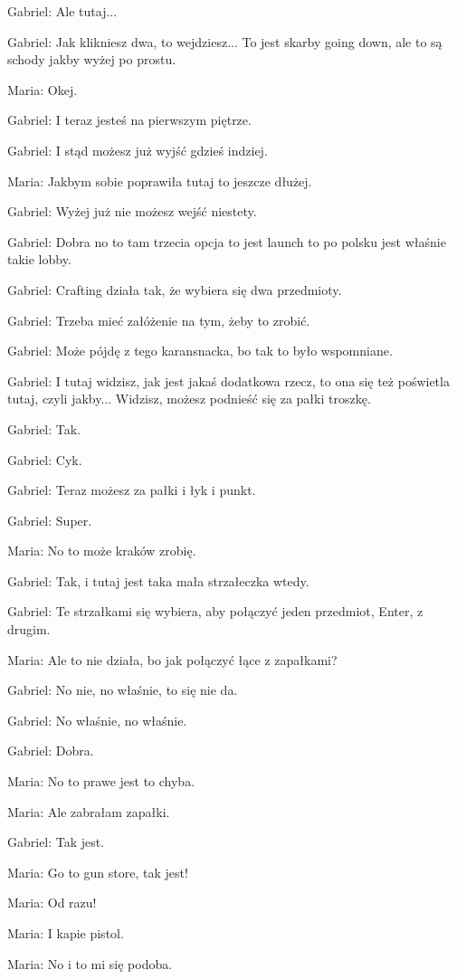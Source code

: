 Gabriel: Ale tutaj...

Gabriel: Jak klikniesz dwa, to wejdziesz... To jest skarby going down, ale to są schody jakby wyżej po prostu.

Maria: Okej.

Gabriel: I teraz jesteś na pierwszym piętrze.

Gabriel: I stąd możesz już wyjść gdzieś indziej.

Maria: Jakbym sobie poprawiła tutaj to jeszcze dłużej.

Gabriel: Wyżej już nie możesz wejść niestety.

Gabriel: Dobra no to tam trzecia opcja to jest launch to po polsku jest właśnie takie lobby.

Gabriel: Crafting działa tak, że wybiera się dwa przedmioty.

Gabriel: Trzeba mieć załóżenie na tym, żeby to zrobić.

Gabriel: Może pójdę z tego karansnacka, bo tak to było wspomniane.

Gabriel: I tutaj widzisz, jak jest jakaś dodatkowa rzecz, to ona się też poświetla tutaj, czyli jakby... Widzisz, możesz podnieść się za pałki troszkę.

Gabriel: Tak.

Gabriel: Cyk.

Gabriel: Teraz możesz za pałki i łyk i punkt.

Gabriel: Super.

Maria: No to może kraków zrobię.

Gabriel: Tak, i tutaj jest taka mała strzałeczka wtedy.

Gabriel: Te strzałkami się wybiera, aby połączyć jeden przedmiot, Enter, z drugim.

Maria: Ale to nie działa, bo jak połączyć łące z zapałkami?

Gabriel: No nie, no właśnie, to się nie da.

Gabriel: No właśnie, no właśnie.

Gabriel: Dobra.

Maria: No to prawe jest to chyba.

Maria: Ale zabrałam zapałki.

Gabriel: Tak jest.

Maria: Go to gun store, tak jest!

Maria: Od razu!

Maria: I kapie pistol.

Maria: No i to mi się podoba.


